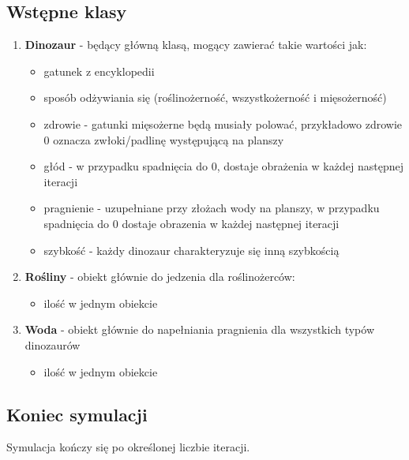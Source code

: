 \subsection{Wstępne klasy}
\begin{enumerate}
    \item \textbf{Dinozaur} - będący główną klasą, mogący zawierać takie wartości jak: 
    \begin{itemize}
        \item gatunek z encyklopedii
        \item sposób odżywiania się (roślinożerność, wszystkożerność i mięsożerność)
        \item zdrowie - gatunki mięsożerne będą musiały polować, przykładowo zdrowie 0 oznacza zwłoki/padlinę występującą na planszy
        \item głód - w przypadku spadnięcia do 0, dostaje obrażenia w każdej następnej iteracji
        \item pragnienie - uzupełniane przy złożach wody na planszy, w przypadku spadnięcia do 0 dostaje obrazenia w każdej następnej iteracji
        \item szybkość - każdy dinozaur charakteryzuje się inną szybkością
    \end{itemize}
    \item \textbf{Rośliny} - obiekt głównie do jedzenia dla roślinożerców:
    \begin{itemize}
        \item ilość w jednym obiekcie
    \end{itemize}
    \item \textbf{Woda} - obiekt głównie do napełniania pragnienia dla wszystkich typów dinozaurów
    \begin{itemize}
        \item ilość w jednym obiekcie
    \end{itemize}
\end{enumerate}
\subsection{Koniec symulacji}
Symulacja kończy się po określonej liczbie iteracji.

